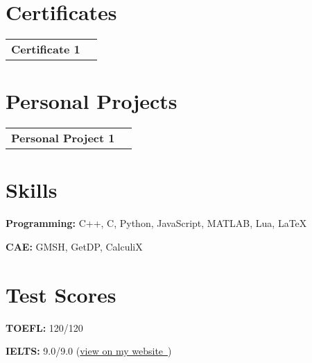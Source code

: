 \documentclass[10pt, a4paper]{article}
\newcommand{\hrefExternal}[2]{\href{#1}{#2\, \raisebox{.1ex}{\footnotesize \faExternalLink*}}} %
\begin{document}
    \section{Certificates}
        \begin{tabularx}{\textwidth}{K{0.2 cm} R{3.6 cm}}
            \textbf{Certificate 1}
            \vspace*{0.12 cm}
        &
            \end{tabularx}


    \section{Personal Projects}
        \begin{tabularx}{\textwidth}{K{0.2 cm} R{3.6 cm}}
            \textbf{Personal Project 1}
            \vspace*{0.12 cm}
        &
            \end{tabularx}


    \section{Skills}
            \setlength{\leftskip}{0.2cm}

            \textbf{Programming:} C++, C, Python, JavaScript, MATLAB, Lua, LaTeX

            \setlength{\leftskip}{0cm}

        \vspace*{0.12 cm}
        
            \setlength{\leftskip}{0.2cm}

            \textbf{CAE:} GMSH, GetDP, CalculiX

            \setlength{\leftskip}{0cm}


    \section{Test Scores}
            \setlength{\leftskip}{0.2cm}

            \textbf{TOEFL:} 120/120

            \setlength{\leftskip}{0cm}

        \vspace*{0.12 cm}
        
            \setlength{\leftskip}{0.2cm}

            \textbf{IELTS:} 9.0/9.0 (\hrefExternal{https://example.com/}{view on my website})
\end{document}
